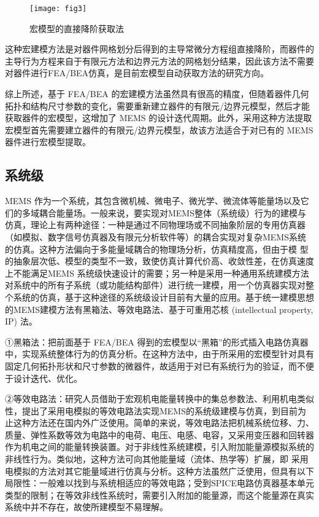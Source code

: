 \documentclass[no-math]{YangThesis}
\begin{document}
\begin{figure}[!htbp]
	\centering
	\texttt{[image: fig3]}
	\caption{宏模型的直接降阶获取法}
     \label{fig3}
\end{figure}

这种宏建模方法是对器件网格划分后得到的主导常微分方程组直接降阶，而器件的主导行为方程来自于有限元方法和边界元方法的网格划分结果，因此该方法不需要对器件进行FEA/BEA仿真，是目前宏模型自动获取方法的研究方向。

综上所述，基于 FEA/BEA 的宏建模方法虽然具有很高的精度，但随着器件几何拓扑和结构尺寸参数的变化，需要重新建立器件的有限元/边界元模型，然后才能获取器件的宏模型，这增加了 MEMS 的设计迭代周期。此外，采用这种方法提取宏模型首先需要建立器件的有限元/边界元模型，故该方法适合于对已有的 MEMS 器件进行宏模型提取。

\subsection{系统级}
MEMS 作为一个系统，其包含微机械、微电子、微光学、微流体等能量场以及它们的多域耦合能量场。一般来说，要实现对MEMS整体（系统级）行为的建模与仿真，理论上有两种途径：一种是通过不同物理场或不同抽象阶层的专用仿真器（如模拟、数字信号仿真器及有限元分析软件等）的耦合实现对复杂MEMS系统的仿真\cite{bibc50}。这种方法偏向于多能量域耦合的物理场分析，仿真精度高，但由于模 型的抽象层次低、模型的类型不一致，致使仿真计算代价高、收敛性差，在仿真速度上不能满足MEMS 系统级快速设计的需要；另一种是采用一种通用系统建模方法对系统中的所有子系统（或功能结构部件）进行统一建模，用一个仿真器实现对整个系统的仿真，基于这种途径的系统级设计目前有大量的应用。基于统一建模思想的MEMS建模方法有黑箱法、等效电路法、基于可重用芯核 (intellectual property, IP) 法。

①黑箱法：把前面基于 FEA/BEA 得到的宏模型以“黑箱”的形式插入电路仿真器中，实现系统整体行为的仿真分析\cite{bibc51}。在这种方法中，由于所采用的宏模型针对具有固定几何拓扑形状和尺寸参数的微器件，故适用于对已有系统行为的验证，而不便于设计迭代、优化。

②等效电路法：研究人员借助于宏观机电能量转换中的集总参数法、利用机电类似性，提出了采用电模拟的等效电路法\cite{bibc52}实现MEMS的系统级建模与仿真，到目前为止这种方法还在国内外广泛使用。简单的来说，等效电路法把机械系统位移、力、质量、弹性系数等效为电路中的电荷、电压、电感、电容，又采用变压器和回转器作为机电之间的能量转换装置。对于非线性系统建模，引入附加能量源模拟系统的非线性行为\cite{bibc53}。类似地，这种方法可向其他能量域（流体、热学等）扩展，即 采用电模拟的方法对其它能量域进行仿真与分析。这种方法虽然广泛使用，但具有以下局限性：一般难以找到与系统相适应的等效电路；受到SPICE电路仿真器基本单元类型的限制；在等效非线性系统时，需要引入附加的能量源，而这个能量源在真实系统中并不存在，故使所建模型不易理解。
\end{document}
